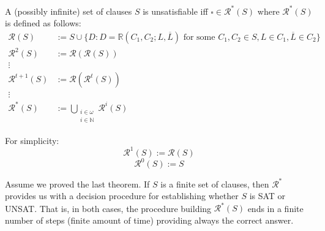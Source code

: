 \begin{theorem}
A (possibly infinite) set of clauses $S$ is unsatisfiable iff  $\square \in \mathcal{R}^\ast (S)$ where $\mathcal{R}^\ast (S)$ is defined as follows:
\begin{align*}
	\mathcal{R}(S) & := S \cup \{D : D = \mathbb{R} (C_1, C_2; L, \overline L) \text{ for some } C_1, C_2 \in S, L \in C_1, \overline L \in C_2 \} \\
	\mathcal{R}^2 (S) & := \mathcal{R} \left(\mathcal{R} (S)\right) \\
	\vdots & \\
	\mathcal{R}^{t+1} (S) & := \mathcal{R} \left(\mathcal{R}^t (S)\right) \\
	\vdots & \\
	\mathcal{R}^\ast (S) & := \bigcup_{\substack{i \in \omega \\ i \in \mathbb{N}}} \mathcal{R}^i (S)
\end{align*}

\noindent
For simplicity:
$$ \mathcal{R}^1 (S) := \mathcal{R} (S) $$
$$ \mathcal{R}^0 (S) := S $$
\end {theorem}

\begin{remark}
	Assume we proved the last theorem. If $S$ is a finite set of clauses, then $\mathcal{R}^\ast$ provides us with a decision procedure for establishing whether $S$ is SAT or UNSAT. That is, in both cases, the procedure building $\mathcal{R}^\ast (S)$ ends in a finite number of steps (finite amount of time) providing always the correct answer.
\end{remark}

